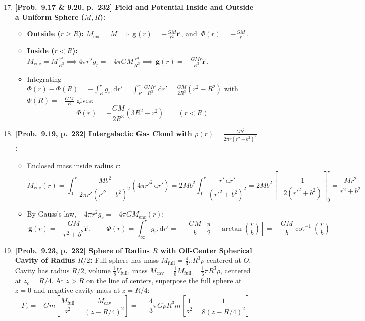 \documentclass[11pt,a4paper,openany,oneside]{book}
\newcommand{\eqbox}[1]{\boxed{\,#1\,}}
\newcommand{\vect}[1]{\mathbf{#1}}
\newcommand{\uv}[1]{\hat{\mathbf{#1}}}
\newcommand{\dd}{\,\mathrm{d}}
\numberwithin{equation}{chapter}
\begin{document}
\begin{enumerate}[label=\textbf{Prob.\ 9.\arabic*},leftmargin=4.2em]
  \setcounter{enumi}{16}
  \item \textbf{[Prob.\ 9.17 \& 9.20, p.\ 232] Field and Potential Inside and Outside a Uniform Sphere ($M, R$):}
  \begin{itemize}
    \item \textbf{Outside ($r \ge R$):} $M_{\text{enc}} = M \implies \eqbox{\vect{g}(r) = -\frac{GM}{r^2}\uv{r}}$, and $\eqbox{\Phi(r) = -\frac{GM}{r}}$.
    \item \textbf{Inside ($r < R$):} $M_{\text{enc}} = M\frac{r^3}{R^3} \implies 4\pi r^2 g_r = -4\pi G M\frac{r^3}{R^3} \implies \eqbox{\vect{g}(r) = -\frac{GMr}{R^3}\uv{r}}$.
    \item Integrating $\Phi(r) - \Phi(R) = -\int_R^r g_{r'}\dd r' = \int_R^r \frac{GMr'}{R^3}\dd r' = \frac{GM}{2R^3}(r^2 - R^2)$ with $\Phi(R) = -\frac{GM}{R}$ gives:
    \begin{equation*}
      \eqbox{\Phi(r) = -\frac{GM}{2R^3}(3R^2 - r^2) \qquad (r < R)}
    \end{equation*}
  \end{itemize}

  \setcounter{enumi}{18}
  \item \textbf{[Prob.\ 9.19, p.\ 232] Intergalactic Gas Cloud with $\rho(r) = \frac{Mb^2}{2\pi r(r^2+b^2)^2}$:}
  \begin{itemize}
    \item Enclosed mass inside radius $r$:
    \begin{equation*}
      M_{\text{enc}}(r) = \int_0^r \frac{Mb^2}{2\pi r'(r'^2+b^2)^2}(4\pi r'^2\dd r') = 2Mb^2\int_0^r \frac{r'\dd r'}{(r'^2+b^2)^2} = 2Mb^2\!\left[-\frac{1}{2(r'^2+b^2)}\right]_0^r = \frac{Mr^2}{r^2+b^2}
    \end{equation*}
    \item By Gauss's law, $-4\pi r^2 g_r = -4\pi G M_{\text{enc}}(r)$:
    \begin{equation*}
      \eqbox{\vect{g}(r) = -\frac{GM}{r^2+b^2}\uv{r}}, \qquad \Phi(r) = \int_\infty^r g_{r'}\dd r' = \eqbox{-\frac{GM}{b}\!\left[\frac{\pi}{2} - \arctan\!\left(\frac{r}{b}\right)\right] = -\frac{GM}{b}\cot^{-1}\!\left(\frac{r}{b}\right)}
    \end{equation*}
  \end{itemize}

  \setcounter{enumi}{22}
  \item \textbf{[Prob.\ 9.23, p.\ 232] Sphere of Radius $R$ with Off-Center Spherical Cavity of Radius $R/2$:}
  Full sphere has mass $M_{\text{full}} = \frac{4}{3}\pi R^3\rho$ centered at $O$. Cavity has radius $R/2$, volume $\frac{1}{8}V_{\text{full}}$, mass $M_{\text{cav}} = \frac{1}{8}M_{\text{full}} = \frac{1}{6}\pi R^3\rho$, centered at $z_c = R/4$. At $z > R$ on the line of centers, superpose the full sphere at $z=0$ and negative cavity mass at $z = R/4$:
  \begin{equation*}
    F_z = -Gm\!\left[\frac{M_{\text{full}}}{z^2} - \frac{M_{\text{cav}}}{(z - R/4)^2}\right] = \eqbox{-\frac{4}{3}\pi G\rho R^3 m\!\left[\frac{1}{z^2} - \frac{1}{8(z - R/4)^2}\right]}
  \end{equation*}


\end{enumerate}
\end{document}

